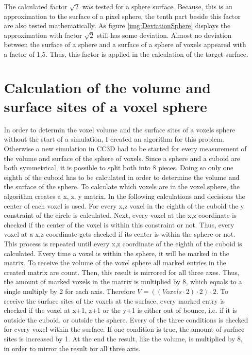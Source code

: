 The calculated factor $\sqrt{2}$ was tested for a sphere surface. Because, this is an approximation to the surface of a pixel sphere, the tenth part beside this factor are also tested mathematically. As figure \ref{img:DeviationSphere} displays the  approximation with factor $\sqrt{2}$ still has some deviation. Almost no deviation between the surface of a sphere and a surface of a sphere of voxels appeared with a factor of $1.5$. Thus, this factor is applied in the calculation of the target surface. 

\section{Calculation of the volume and surface sites of a voxel sphere}\label{sec:CreatedAlgorithm}
In order to determin the voxel volume and the surface sites of a voxels sphere without the start of a simulation, I created an algorithm for this problem. Otherwise a new simulation in \ac{CC3D} had to be started for every measurement of the volume and surface of the sphere of voxels. \newline
Since a sphere and a cuboid are both symmetrical, it is possible to split both into 8 pieces. Doing so only one eighth of the cuboid has to be calculated in order to determine the volume and the surface of the sphere. \newline
To calculate which voxels are in the voxel sphere, the algorithm creates a x, z, y matrix. In the following calculations and decisions the center of each voxel is used. For every x,z voxel in the eighth of the cuboid the y constraint of the circle is calculated. Next, every voxel at the x,z coordinate is checked if the center of the voxel is within this constraint or not. Thus, every voxel at a x,z coordinate gets checked if its center is within the sphere or not. This process is repeated until every x,z coordinate of the eighth of the cuboid is calculated. Every time a voxel is within the sphere, it will be marked in the matrix.  \newline
To receive the volume of the voxel sphere all marked entries in the created matrix are count. Then, this result is mirrored for all three axes. Thus, the amount of marked voxels in the matrix is multiplied by 8, which equals to a single multiply by 2 for each axis. Therefore $V=((Voxels \cdot 2) \cdot 2) \cdot 2$.
To receive the surface sites of the voxels at the surface, every marked entry is checked if the voxel at x+1, z+1 or the y+1 is either out of bounce, i.e. if it is outside the cuboid, or outside the sphere. Every of the three conditions is checked for every voxel within the surface. If one condition is true, the amount of surface sites is increased by 1. At the end the result, like the volume, is multiplied by 8, in order to mirror the result for all three axis.



